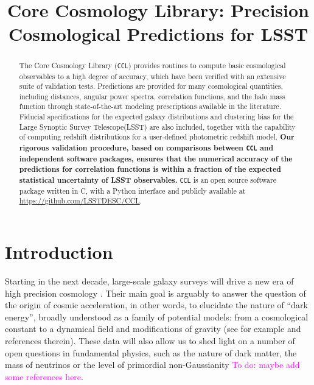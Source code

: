 \documentclass[\docopts]{\docclass}
\newcommand{\todo}[1]{\textcolor{magenta}{To do: #1}}
\newcommand{\ccl}{{\tt CCL}\xspace}
\begin{document}
\title{Core Cosmology Library: Precision Cosmological Predictions for LSST}

\maketitlepre

\begin{abstract}

The Core Cosmology Library (\ccl) provides routines to compute basic cosmological observables to a high degree of accuracy, which have been verified with an extensive suite of validation tests. Predictions are provided for many cosmological quantities, including distances, angular power spectra, correlation functions, and the halo mass function through state-of-the-art modeling prescriptions available in the literature. Fiducial specifications for the expected galaxy distributions and clustering bias for the Large Synoptic Survey Telescope(LSST) are also included, together with the capability of computing redshift distributions for a user-defined photometric redshift model. {\bf Our rigorous validation procedure, based on comparisons between \ccl and independent software packages, ensures that the numerical accuracy of the predictions for correlation functions is within a fraction of the expected statistical uncertainty of LSST observables.} \ccl is an open source software package written in C, with a Python interface and publicly available at \url{https://github.com/LSSTDESC/CCL}. 

\end{abstract}

\maketitlepost



\section{Introduction}
\label{sec:intro}

Starting in the next decade, large-scale galaxy surveys will drive a new era of high precision cosmology \citep{DESCWhite,green11,Laureijs11}. Their main goal is arguably to answer the question of the origin of cosmic acceleration, in other words, to elucidate the nature of ``dark energy'', broadly understood as a family of potential models: from a cosmological constant to a dynamical field and modifications of gravity (see for example  \cite{Carroll2001CC,Peebles2003,Padmanabhan2003,Copeland2006,Ishak2007,Weinberg13} and references therein). These data will also allow us to shed light on a number of open questions in fundamental physics, such as the nature of dark matter, the mass of neutrinos or the level of primordial non-Gaussianity \todo{maybe add some references here}.
\end{document}
